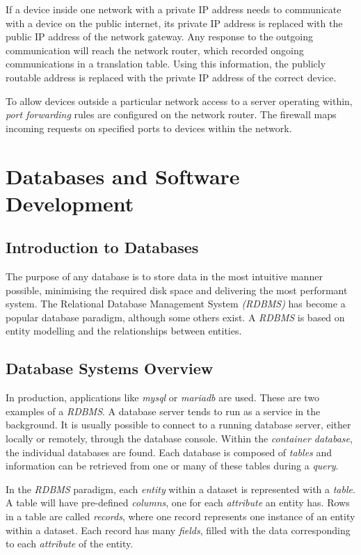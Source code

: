 \documentclass[9pt]{article}
\let\oldsection\section
\renewcommand\section{\clearpage\oldsection}
\begin{document}
If a device inside one network with a private IP address needs to communicate with a device on the public internet, its private IP address is replaced with the public IP address of the network gateway. Any response to the outgoing communication will reach the network router, which recorded ongoing communications in a translation table. Using this information, the publicly routable address is replaced with the private IP address of the correct device.

To allow devices outside a particular network access to a server operating within, \emph{port forwarding} rules are configured on the network router. The firewall maps incoming requests on specified ports to devices within the network.

\section{Databases and Software Development}
\label{sec:org1eac048}
\subsection{Introduction to Databases}
\label{sec:org18d84e9}

The purpose of any database is to store data in the most intuitive manner possible, minimising the required disk space and delivering the most performant system. The Relational Database Management System \emph{(RDBMS)} has become a popular database paradigm, although some others exist. A \emph{RDBMS} is based on entity modelling and the relationships between entities.

\subsection{Database Systems Overview}
\label{sec:org045d104}

In production, applications like \emph{mysql} or \emph{mariadb} are used. These are two examples of a \emph{RDBMS}. A database server tends to run as a service in the background. It is usually possible to connect to a running database server, either locally or remotely, through the database console. Within the \emph{container database}, the individual databases are found. Each database is composed of \emph{tables} and information can be retrieved from one or many of these tables during a \emph{query}.

In the \emph{RDBMS} paradigm, each \emph{entity} within a dataset is represented with a \emph{table}. A table will have pre-defined \emph{columns}, one for each \emph{attribute} an entity has. Rows in a table are called \emph{records}, where one record represents one instance of an entity within a dataset. Each record has many \emph{fields}, filled with the data corresponding to each \emph{attribute} of the entity.
\end{document}
